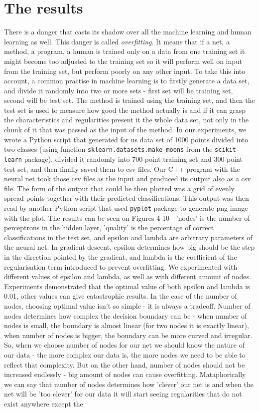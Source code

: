 \documentclass[3p,twocolumn]{elsarticle}
\begin{document}
\section{The results}

There is a danger that casts its shadow over all the machine learning and human learning as well. This danger is called \emph{overfitting}. It means that if a net, a method, a program, a human is trained only on a data from one training set it might become too adjusted to the training set so it will perform well on input from the training set, but perform poorly on any other input. To take this into account, a common practise in machine learning is to firstly generate a data set, and divide it randomly into two or more sets - first set will be training set, second will be test set. The method is trained using the training set, and then the test set is used to measure how good the method actually is and if it can grasp the characteristics and regularities present it the whole data set, not only in the chunk of it that was passed as the input of the method. In our experiments, we wrote a Python script that generated for us data set of 1000 points divided into two classes (using function \texttt{sklearn.datasets.make\_moons} from the \texttt{scikit-learn} package), divided it randomly into 700-point training set and 300-point test set, and then finally saved them to csv files. Our C++ program with the neural net took those csv files as the input and produced its output also as a csv file. The form of the output that could be then plotted was a grid of evenly spread points together with their predicted classifications. This output was then read by another Python script that used \texttt{pyplot} package to generate png image with the plot. The results can be seen on Figures 4-10 - 'nodes' is the number of perceptrons in the hidden layer, 'quality' is the percentage of correct classifications in the test set, and epsilon and lambda are arbitrary parameters of the neural net. In gradient descent, epsilon determines how big should be the step in the direction pointed by the gradient, and lambda is the coefficient of the regularisation term introduced to prevent overfitting. We experimented with different values of epsilon and lambda, as well as with different amount of nodes. Experiments demonstrated that the optimal value of both epsilon and lambda is 0.01, other values can give catastrophic results. In the case of the number of nodes, choosing optimal value isn't so simple - it is always a tradeoff. Number of nodes determines how complex the decision boundary can be - when number of nodes is small, the boundary is almost linear (for two nodes it is exactly linear), when number of nodes is bigger, the boundary can be more curved and irregular. So, when we choose number of nodes for our net we should know the nature of our data - the more complex our data is, the more nodes we need to be able to reflect that complexity. But on the other hand, number of nodes should not be increased endlessly - big amount of nodes can cause overfitting. Mataphorically we can say that number of nodes determines how 'clever' our net is and when the net will be 'too clever' for our data it will start seeing regularities that do not exist anywhere except the 
\end{document}
